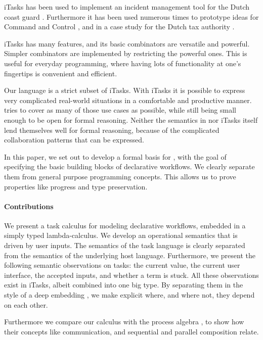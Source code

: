 iTasks has been used to implement an incident management tool for the Dutch coast guard \cite{conf/iscram/LijnseJP12}.
Furthermore it has been used numerous times to prototype ideas for Command and Control \cite{theses/nlda/Kool17, theses/radboud/Stutterheim17}, and in a case study for the Dutch tax authority \cite{conf/sfp/StutterheimAP17}.

iTasks has many features, and its basic combinators are versatile and powerful.
Simpler combinators are implemented by restricting the powerful ones.
This is useful for everyday programming, where having lots of functionality at one's fingertips is convenient and efficient.

Our language is a strict subset of iTasks.
With iTasks it is possible to express very complicated real-world situations in a comfortable and productive manner.
\TOPHAT tries to cover as many of those use cases as possible, while still being small enough to be open for formal reasoning.
Neither the semantics in \cite{conf/ppdp/PlasmeijerLMAK12} nor iTasks itself lend themselves well for formal reasoning, because of the complicated collaboration patterns that can be expressed.

In this paper, we set out to develop a formal basis for \TOP, with the goal of specifying the basic building blocks of declarative workflows.
We clearly separate them from general purpose programming concepts.
This allows us to prove properties like progress and type preservation.

\paragraph{Contributions}
We present a task calculus for modeling declarative workflows, embedded in a simply typed lambda-calculus.
We develop an operational semantics that is driven by user inputs.
The semantics of the task language is clearly separated from the semantics of the underlying host language.
Furthermore, we present the following semantic observations on tasks: the current value, the current user interface, the accepted inputs, and whether a term is stuck.
All these observations exist in iTasks, albeit combined into one big type.
By separating them in the style of a deep embedding \cite{conf/cefp/Gibbons13}, we make explicit where, and where not, they depend on each other.

Furthermore we compare our calculus with the process algebra \CSP, to show how their concepts like communication, and sequential and parallel composition relate.
